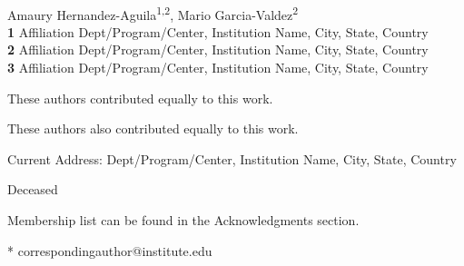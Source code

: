 \documentclass[10pt,letterpaper]{article}
\begin{document}
\vspace*{0.2in}

\begin{flushleft}
{\Large
\textbf{} %
}
\newline
\\
Amaury Hernandez-Aguila\textsuperscript{1,2\Yinyang},
Mario Garcia-Valdez\textsuperscript{2\Yinyang}
\\
\bigskip
\textbf{1} Affiliation Dept/Program/Center, Institution Name, City, State, Country
\\
\textbf{2} Affiliation Dept/Program/Center, Institution Name, City, State, Country
\\
\textbf{3} Affiliation Dept/Program/Center, Institution Name, City, State, Country
\\
\bigskip

% 
%
\Yinyang These authors contributed equally to this work.

\ddag These authors also contributed equally to this work.

\textcurrency Current Address: Dept/Program/Center, Institution Name, City, State, Country %

\dag Deceased

\textpilcrow Membership list can be found in the Acknowledgments section.

* correspondingauthor@institute.edu

\end{flushleft}
\end{document}
